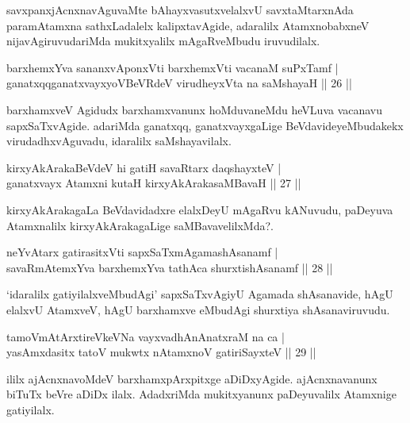 \begin{artha}
savxpanxjAcnxnavAguvaMte bAhayxvasutxvelalxvU savxtaMtarxnAda paramAtamxna sathxLadalelx kalipxtavAgide, adaralilx AtamxnobabxneV nijavAgiruvudariMda mukitxyalilx mAgaRveMbudu iruvudilalx.
\end{artha}

\begin{shl}
barxhemxYva sananxvAponxVti barxhemxVti vacanaM suPxTamf |\\
ganatxqqganatxvayxyoVBeVRdeV virudheyxVta na saMshayaH \hfill || 26 || 
\end{shl}

\begin{artha}
barxhamxveV Agidudx barxhamxvanunx hoMduvaneMdu heVLuva vacanavu sapxSaTxvAgide. adariMda ganatxqq, ganatxvayxgaLige BeVdavideyeMbudakekx virudadhxvAguvadu, idaralilx saMshayavilalx.
\end{artha}

\begin{shl}
kirxyAkArakaBeVdeV hi gatiH savaRtarx daqshayxteV |\\
ganatxvayx Atamxni kutaH kirxyAkArakasaMBavaH \hfill || 27 || 
\end{shl}

\begin{artha}
kirxyAkArakagaLa BeVdavidadxre elalxDeyU mAgaRvu kANuvudu, paDeyuva Atamxnalilx kirxyAkArakagaLige saMBavavelilxMda?.
\end{artha}

\begin{shl}
neYvAtarx gatirasitxVti sapxSaTxmAgamashAsanamf |\\
savaRmAtemxYva barxhemxYva tathAca shurxtishAsanamf \hfill || 28 || 
\end{shl}

\begin{artha}
`idaralilx gatiyilalxveMbudAgi' sapxSaTxvAgiyU Agamada shAsanavide, hAgU elalxvU AtamxveV, hAgU barxhamxve eMbudAgi shurxtiya shAsanaviruvudu.
\end{artha}

\begin{shl}
tamoVmAtArxtireVkeVNa vayxvadhAnAnatxraM na ca |\\
yasAmxdasitx tatoV mukwtx nA\s \s tamxnoV gatiriSayxteV \hfill || 29 || 
\end{shl}

\begin{artha}
ililx ajAcnxnavoMdeV barxhamxpArxpitxge aDiDxyAgide. ajAcnxnavanunx biTuTx beVre aDiDx ilalx. AdadxriMda mukitxyanunx paDeyuvalilx Atamxnige gatiyilalx.
\end{artha}

